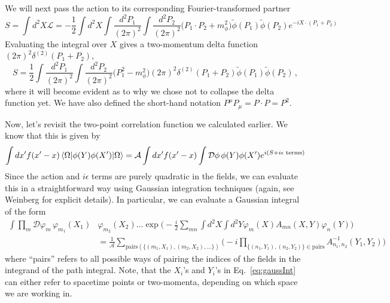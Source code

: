 \documentclass{article}
\numberwithin{equation}{subsection}
\begin{document}
We will next pass the action to its corresponding Fourier-transformed partner
\begin{equation}
    S = \int d^2X \mathcal{L} = - \frac{1}{2}\int d^2 X\int\frac{d^2P_1}{(2\pi)^2}\int\frac{d^2P_2}{(2\pi)^2}\Big(P_1\cdot P_2 + m_\phi^2\Big)\tilde{\phi}(P_1)\tilde{\phi}(P_2)e^{-iX\cdot(P_1 + P_2)}
\end{equation}
Evaluating the integral over $X$ gives a two-momentum delta function $(2\pi)^2\delta^{(2)}(P_1 + P_2)$,
\begin{equation}\label{eq:freeAct}
    S = \frac{1}{2}\int\frac{d^2 P_1}{(2\pi)^2}\int\frac{d^2 P_2}{(2\pi)^2}\Big(P_1^2 - m_\phi^2\Big)(2\pi)^2\delta^{(2)}(P_1 + P_2)\tilde{\phi}(P_1)\tilde{\phi}(P_2)\,,
\end{equation}
where it will become evident as to why we chose not to collapse the delta function yet. We have also defined the short-hand notation $P^\mu P_\mu = P\cdot P = P^2$.

Now, let's revisit the two-point correlation function we calculated earlier. We know that this is given by
\begin{equation}
    \int dx' f(x' - x)\mel{\Omega}{\phi(Y)\phi(X')}{\Omega} =\mathcal{A} \int dx' f(x' - x)\int\mathcal{D}\phi \,\phi(Y)\phi(X')e^{i(S + i\epsilon\text{ terms})}
\end{equation}
Since the action and $i\epsilon$ terms are purely quadratic in the fields, we can evaluate this in a straightforward way using Gaussian integration techniques 
(again, see Weinberg for explicit details). In particular, we can evaluate a Gaussian integral of the form
\begin{equation}\label{eq:gaussInt}
    \begin{split}
        \int\prod_m\mathcal{D}\varphi_m\,\varphi_{m_1}(X_1)&\varphi_{m_2}(X_2)\dots \exp\Bigg(-\frac{i}{2}\sum_{mn}\int d^2 X\int d^2Y \varphi_m(X)A_{mn}(X, Y)\varphi_n(Y)\Bigg)\\[0.5em]
        &= \frac{1}{\mathcal{A}}\sum_{\text{pairs}(\{(m_1,X_1),(m_2,X_2),\dots\})}\big(-i\prod_{\{(n_1,Y_1),(n_2,Y_2)\}\in \text{pairs}} A^{-1}_{n_1,n_2}(Y_1, Y_2)\big)
    \end{split}
\end{equation}
where ``pairs'' refers to all possible ways of pairing the indices of the fields in the integrand of the path integral. Note, that the $X_i$'s and $Y_i$'s 
in Eq.~\eqref{eq:gaussInt} can either refer to spacetime points or two-momenta, depending on which space we are working in.
\end{document}
